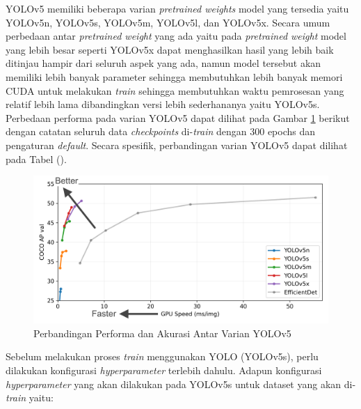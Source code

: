 YOLOv5 memiliki beberapa varian \textit{pretrained weights} model yang tersedia yaitu YOLOv5n, YOLOv5s, YOLOv5m, YOLOv5l, dan YOLOv5x. Secara umum perbedaan antar \textit{pretrained weight} yang ada yaitu pada \textit{pretrained weight} model yang lebih besar seperti YOLOv5x dapat menghasilkan hasil yang lebih baik ditinjau hampir dari seluruh aspek yang ada, namun model tersebut akan memiliki lebih banyak parameter sehingga membutuhkan lebih banyak memori CUDA untuk melakukan \textit{train} sehingga membutuhkan waktu pemrosesan yang relatif lebih lama dibandingkan versi lebih sederhananya yaitu YOLOv5s. Perbedaan performa pada varian YOLOv5 dapat dilihat pada Gambar \ref*{fig:yolov5comparison} berikut dengan catatan seluruh data \textit{checkpoints} di-\textit{train} dengan 300 epochs dan pengaturan \textit{default}. Secara spesifik, perbandingan varian YOLOv5 dapat dilihat pada Tabel (). \par
\begin{figure}[H]
    \centering
    \includegraphics[scale=0.75]{gambar/yolov5comparison.png}
    \caption{Perbandingan Performa dan Akurasi Antar Varian YOLOv5}
    \label{fig:yolov5comparison}
\end{figure}

Sebelum melakukan proses \textit{train} menggunakan YOLO (YOLOv5s), perlu dilakukan konfigurasi \textit{hyperparameter} terlebih dahulu. Adapun konfigurasi \textit{hyperparameter} yang akan dilakukan pada YOLOv5s untuk dataset yang akan di-\textit{train} yaitu: \par


